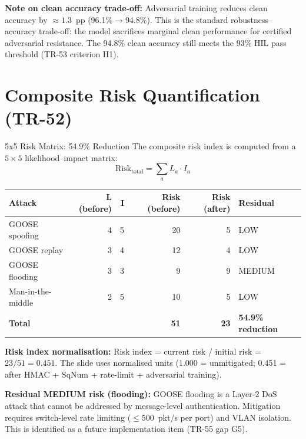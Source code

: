 \documentclass[12pt,a4paper]{article}
\begin{document}
\textbf{Note on clean accuracy trade-off:} Adversarial training reduces clean accuracy by $\approx 1.3$~pp (96.1\%$\to$94.8\%). This is the standard robustness--accuracy trade-off: the model sacrifices marginal clean performance for certified adversarial resistance. The 94.8\% clean accuracy still meets the 93\% HIL pass threshold (TR-53 criterion H1).

\section{Composite Risk Quantification (TR-52)}

\begin{resultbox}{5x5 Risk Matrix: 54.9\% Reduction}
The composite risk index is computed from a $5\times5$ likelihood--impact matrix:
\[
  \mathrm{Risk}_\mathrm{total} = \sum_a L_a \cdot I_a
\]

\begin{center}
\begin{tabular}{@{}lrrrrl@{}}
\toprule
\textbf{Attack} & \textbf{L (before)} & \textbf{I} & \textbf{Risk (before)} & \textbf{Risk (after)} & \textbf{Residual} \\
\midrule
GOOSE spoofing    & 4 & 5 & 20 &  5 & LOW \\
GOOSE replay      & 3 & 4 & 12 &  4 & LOW \\
GOOSE flooding    & 3 & 3 &  9 &  9 & MEDIUM \\
Man-in-the-middle & 2 & 5 & 10 &  5 & LOW \\
\midrule
\textbf{Total}    &   &   & \textbf{51} & \textbf{23} & \textbf{54.9\% reduction} \\
\bottomrule
\end{tabular}
\end{center}

\textbf{Risk index normalisation:} Risk index = current risk / initial risk = $23/51 = 0.451$. The slide uses normalised units (1.000 = unmitigated; 0.451 = after HMAC + SqNum + rate-limit + adversarial training).

\textbf{Residual MEDIUM risk (flooding):} GOOSE flooding is a Layer-2 DoS attack that cannot be addressed by message-level authentication. Mitigation requires switch-level rate limiting ($\leq 500$~pkt/s per port) and VLAN isolation. This is identified as a future implementation item (TR-55 gap G5).
\end{resultbox}

\end{document}
